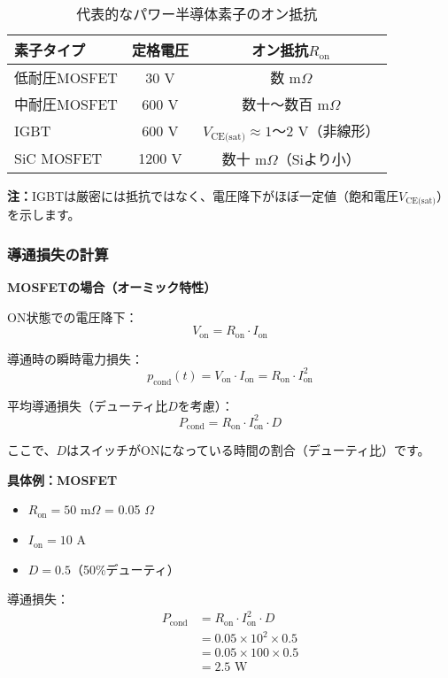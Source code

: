 \begin{table}[H]
\centering
\caption{代表的なパワー半導体素子のオン抵抗}
\begin{tabular}{|l|c|c|}
\hline
\textbf{素子タイプ} & \textbf{定格電圧} & \textbf{オン抵抗$R_{\text{on}}$} \\
\hline
\hline
低耐圧MOSFET & 30 V & 数 m$\Omega$ \\
\hline
中耐圧MOSFET & 600 V & 数十〜数百 m$\Omega$ \\
\hline
IGBT & 600 V & $V_{\text{CE(sat)}} \approx 1$〜2 V（非線形） \\
\hline
SiC MOSFET & 1200 V & 数十 m$\Omega$（Siより小） \\
\hline
\end{tabular}
\end{table}

\textbf{注：}IGBTは厳密には抵抗ではなく、電圧降下がほぼ一定値（飽和電圧$V_{\text{CE(sat)}}$）を示します。

\subsubsection{導通損失の計算}

\textbf{MOSFETの場合（オーミック特性）}

ON状態での電圧降下：
\begin{equation}
V_{\text{on}} = R_{\text{on}} \cdot I_{\text{on}}
\end{equation}

導通時の瞬時電力損失：
\begin{equation}
p_{\text{cond}}(t) = V_{\text{on}} \cdot I_{\text{on}} = R_{\text{on}} \cdot I_{\text{on}}^2
\end{equation}

平均導通損失（デューティ比$D$を考慮）：
\begin{equation}
\boxed{P_{\text{cond}} = R_{\text{on}} \cdot I_{\text{on}}^2 \cdot D}
\end{equation}

ここで、$D$はスイッチがONになっている時間の割合（デューティ比）です。

\begin{screen}
\textbf{具体例：MOSFET}

\begin{itemize}
\item $R_{\text{on}} = 50$ m$\Omega$ = 0.05 $\Omega$
\item $I_{\text{on}} = 10$ A
\item $D = 0.5$（50\%デューティ）
\end{itemize}

導通損失：
\begin{align}
P_{\text{cond}} &= R_{\text{on}} \cdot I_{\text{on}}^2 \cdot D \\
&= 0.05 \times 10^2 \times 0.5 \\
&= 0.05 \times 100 \times 0.5 \\
&= 2.5 \text{ W}
\end{align}
\end{screen}

